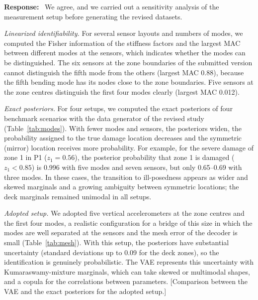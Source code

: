 \documentclass[11pt]{article}
\newenvironment{response}{\par\smallskip\noindent\color{resp}\textbf{Response:}\ }{\par}
\newcommand{\tbd}[1]{\textcolor{note}{\textsf{[#1]}}}
\begin{document}
\begin{response}
We agree, and we carried out a sensitivity analysis of the measurement setup before generating the revised datasets.

\textit{Linearized identifiability.} For several sensor layouts and numbers of modes, we computed the Fisher
information of the stiffness factors and the largest MAC between different modes at the sensors, which indicates
whether the modes can be distinguished. The six sensors at the zone boundaries of the submitted version cannot
distinguish the fifth mode from the others (largest MAC 0.88), because the fifth bending mode has its nodes close to the
zone boundaries. Five sensors at the zone centres distinguish the first four modes clearly (largest MAC 0.012).

\textit{Exact posteriors.} For four setups, we computed the exact posteriors of four benchmark scenarios with the
data generator of the revised study (Table~\ref{tab:modes}). With fewer modes and sensors, the posteriors widen,
the probability assigned to the true damage location decreases and the symmetric (mirror) location receives more
probability. For example, for the severe damage of zone 1 in P1 ($z_1=0.56$), the posterior probability that zone 1 is
damaged ($z_1<0.85$) is 0.996 with five modes and seven sensors, but only 0.65--0.69 with three modes. In these cases, the transition to ill-posedness appears as
wider and skewed marginals and a growing ambiguity between symmetric locations; the deck marginals remained unimodal
in all setups.

\textit{Adopted setup.} We adopted five vertical accelerometers at the zone centres and the first four modes, a
realistic configuration for a bridge of this size in which the modes are well separated at the sensors and the mesh error
of the decoder is small (Table~\ref{tab:mesh}). With this setup, the posteriors have substantial uncertainty (standard
deviations up to 0.09 for the deck zones), so the identification is genuinely probabilistic. The VAE represents this
uncertainty with Kumaraswamy-mixture marginals, which can take skewed or multimodal shapes, and a copula for the
correlations between parameters. \tbd{Comparison between the VAE and the exact posteriors for the adopted setup.}
\end{response}
\end{document}
